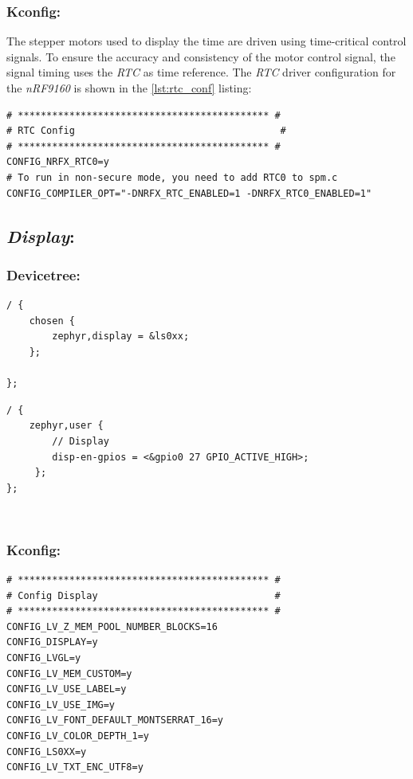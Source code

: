 \documentclass[report.tex]{subfiles}
\begin{document}
\subsubsection{Kconfig:}
The stepper motors used to display the time are driven using time-critical control signals. To ensure the accuracy and consistency of the motor control signal, the signal timing uses the \textit{RTC} as time reference. The \textit{RTC} driver configuration for the \textit{nRF9160} is shown in the \ref{lst:rtc_conf} listing:
\begin{lstlisting}[style=console,label={lst:rtc_conf},caption={Application \textit{RTC} Configuration}]
# ******************************************** #
# RTC Config	                                #
# ******************************************** #
CONFIG_NRFX_RTC0=y
# To run in non-secure mode, you need to add RTC0 to spm.c
CONFIG_COMPILER_OPT="-DNRFX_RTC_ENABLED=1 -DNRFX_RTC0_ENABLED=1"

\end{lstlisting}

\subsection{\textit{Display}:}

\subsubsection{Devicetree:}

\begin{lstlisting}[style=C,label={lst:lcd_def},caption={\textit{DT} \textit{Display} Description}]
/ {
	chosen {
		zephyr,display = &ls0xx;
	};

};
\end{lstlisting}

\begin{lstlisting}[style=C,label={lst:disp_prop_def},caption={\textit{DT Display} Proprieties Description}]
/ {
	zephyr,user {
		// Display
		disp-en-gpios = <&gpio0 27 GPIO_ACTIVE_HIGH>;
	 };
};
\end{lstlisting}
\;\\[-60pt]
\subsubsection{Kconfig:}

\begin{lstlisting}[style=console,label={lst:disp_conf},caption={Application \textit{Display} Configuration}]
# ******************************************** #
# Config Display                               #
# ******************************************** #
CONFIG_LV_Z_MEM_POOL_NUMBER_BLOCKS=16
CONFIG_DISPLAY=y
CONFIG_LVGL=y
CONFIG_LV_MEM_CUSTOM=y
CONFIG_LV_USE_LABEL=y
CONFIG_LV_USE_IMG=y
CONFIG_LV_FONT_DEFAULT_MONTSERRAT_16=y
CONFIG_LV_COLOR_DEPTH_1=y
CONFIG_LS0XX=y
CONFIG_LV_TXT_ENC_UTF8=y
\end{lstlisting}
\end{document}

